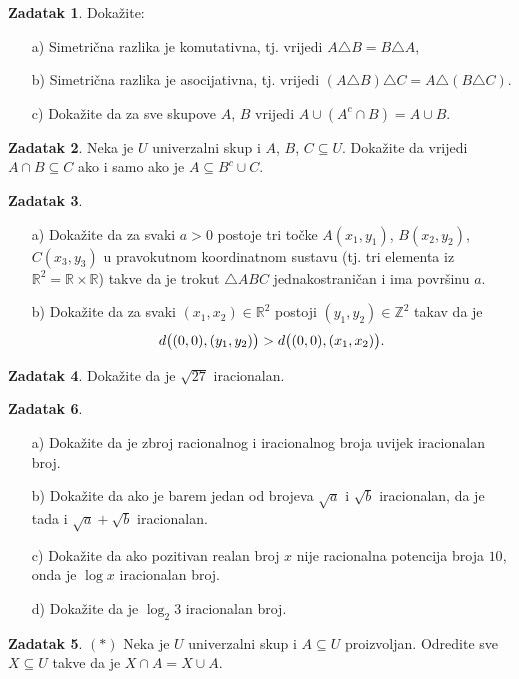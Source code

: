 \documentclass{book}
\let\originalleft\left
\let\originalright\right
\renewcommand{\left}{\mathopen{}\mathclose\bgroup\originalleft}
\renewcommand{\right}{\aftergroup\egroup\originalright}
\theoremstyle{definition}
\theoremstyle{definition}
\newtheorem{exercise}{Zadatak}
\theoremstyle{remark}
\begin{document}
\begin{exercise}
Dokažite:
\begin{itemize}
\item[a)] Simetrična razlika je komutativna, tj. vrijedi $A\triangle B=B\triangle A$,
\item[b)] Simetrična razlika je asocijativna, tj. vrijedi $(A\triangle B)\triangle C=A\triangle (B\triangle C)$.
\item[c)] Dokažite da za sve skupove $A$, $B$ vrijedi $A\cup (A^c\cap B)=A\cup B$.
\end{itemize}
\end{exercise}
\begin{exercise}
Neka je $U$ univerzalni skup i $A$, $B$, $C\subseteq U$. Dokažite da vrijedi $A\cap B\subseteq C$ ako i samo ako je $A\subseteq B^c\cup C$.
\end{exercise}
\begin{exercise} \textbf{}
\begin{itemize}
\item[a)] Dokažite da za svaki $a>0$ postoje tri točke $A(x_1, y_1)$, $B(x_2, y_2)$, $C(x_3, y_3)$ u pravokutnom koordinatnom sustavu (tj. tri elementa iz $\mathbb{R}^2=\mathbb{R}\times\mathbb{R}$) takve da je trokut $\triangle ABC$ jednakostraničan i ima površinu $a$.
\item[b)] Dokažite da za svaki $(x_1, x_2)\in \mathbb{R}^2$ postoji $(y_1, y_2)\in \mathbb{Z}^2$ takav da je $$d\left(\left(0, 0\right), \left(y_1, y_2\right)\right)>d\left(\left(0, 0\right), \left(x_1, x_2\right)\right).$$
\end{itemize}
\end{exercise}
\begin{exercise}
Dokažite da je $\sqrt{27}$ iracionalan.
\end{exercise}
\begin{exercise}\textbf{}
\begin{itemize}
\item[a)] Dokažite da je zbroj racionalnog i iracionalnog broja uvijek iracionalan broj.
\item[b)] Dokažite da ako je barem jedan od brojeva $\sqrt{a}$ i $\sqrt{b}$ iracionalan, da je tada i $\sqrt{a}+\sqrt{b}$ iracionalan.
\item[c)] Dokažite da ako pozitivan realan broj $x$ nije racionalna potencija broja $10$, onda je $\log{x}$ iracionalan broj.
\item[d)] Dokažite da je $\log_2{3}$ iracionalan broj.
\end{itemize}
\begin{exercise} $(*)$
Neka je $U$ univerzalni skup i $A\subseteq U$ proizvoljan. Odredite sve $X\subseteq U$ takve da je $X\cap A=X\cup A$.
\end{exercise}
\end{exercise}
\large
\end{document}
